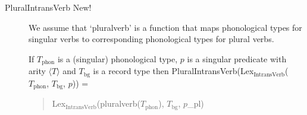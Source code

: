 \begin{description}
  
\item[\textnormal{PluralIntransVerb} New!] \mbox{}

  We assume that `pluralverb' is a function that maps phonological
  types for singular verbs to corresponding phonological types
  for plural verbs.

  If $T_{\text{phon}}$ is a (singular) phonological type, $p$ is a
  singular predicate with arity $\langle T\rangle$ and $T_{\text{bg}}$
  is a record type then
  PluralIntransVerb(Lex$_{\text{IntransVerb}}$($T_{\text{phon}}$,
  $T_{\text{bg}}$, $p$)) =
  \begin{quote}
    Lex$_{\text{IntransVerb}}$(pluralverb($T_{\text{phon}}$),
    $T_{\text{bg}}$, $p$\_pl)
  \end{quote} 
        

  
  
\end{description}


